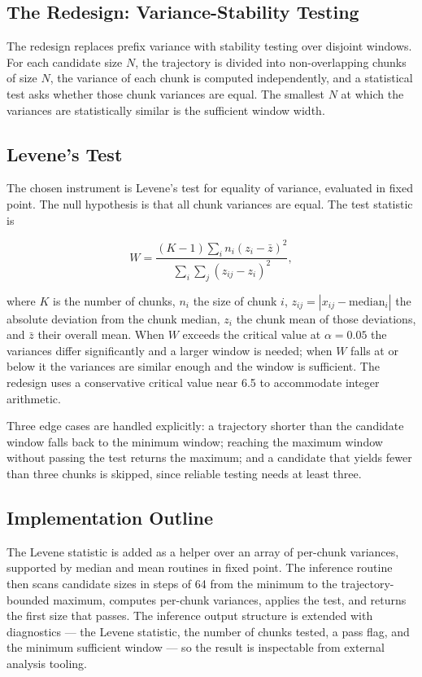 \subsection{The Redesign: Variance-Stability Testing}

The redesign replaces prefix variance with stability testing over disjoint
windows. For each candidate size $N$, the trajectory is divided into
non-overlapping chunks of size $N$, the variance of each chunk is computed
independently, and a statistical test asks whether those chunk variances are
equal. The smallest $N$ at which the variances are statistically similar is the
sufficient window width.

\subsection{Levene's Test}

The chosen instrument is Levene's test for equality of variance, evaluated in
\Qtype{} fixed point. The null hypothesis is that all chunk variances are equal.
The test statistic is

\begin{equation}
W = \frac{(K-1)\sum_i n_i (z_i - \bar{z})^2}
         {\sum_i \sum_j (z_{ij} - z_i)^2},
\end{equation}

where $K$ is the number of chunks, $n_i$ the size of chunk $i$,
$z_{ij} = |x_{ij} - \mathrm{median}_i|$ the absolute deviation from the chunk
median, $z_i$ the chunk mean of those deviations, and $\bar{z}$ their overall
mean. When $W$ exceeds the critical value at $\alpha = 0.05$ the variances differ
significantly and a larger window is needed; when $W$ falls at or below it the
variances are similar enough and the window is sufficient. The redesign uses a
conservative critical value near 6.5 to accommodate integer arithmetic.

Three edge cases are handled explicitly: a trajectory shorter than the candidate
window falls back to the minimum window; reaching the maximum window without
passing the test returns the maximum; and a candidate that yields fewer than
three chunks is skipped, since reliable testing needs at least three.

\subsection{Implementation Outline}

The Levene statistic is added as a helper over an array of per-chunk variances,
supported by median and mean routines in fixed point. The inference routine then
scans candidate sizes in steps of 64 from the minimum to the trajectory-bounded
maximum, computes per-chunk variances, applies the test, and returns the first
size that passes. The inference output structure is extended with diagnostics ---
the Levene statistic, the number of chunks tested, a pass flag, and the minimum
sufficient window --- so the result is inspectable from external analysis tooling.

